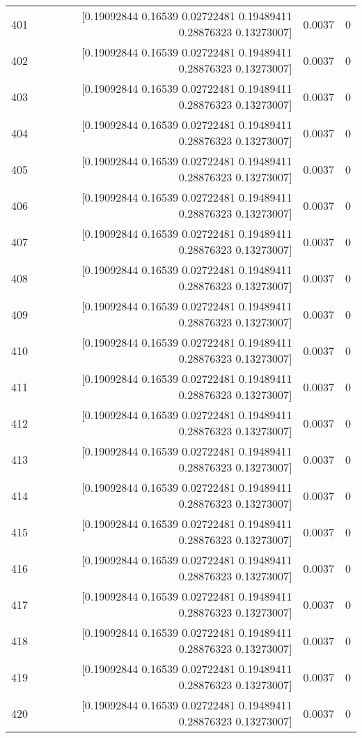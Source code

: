 \begin{longtable}{lrrr}
401 & [0.19092844 0.16539    0.02722481 0.19489411 0.28876323 0.13273007] & 0.0037 & 0 \\
402 & [0.19092844 0.16539    0.02722481 0.19489411 0.28876323 0.13273007] & 0.0037 & 0 \\
403 & [0.19092844 0.16539    0.02722481 0.19489411 0.28876323 0.13273007] & 0.0037 & 0 \\
404 & [0.19092844 0.16539    0.02722481 0.19489411 0.28876323 0.13273007] & 0.0037 & 0 \\
405 & [0.19092844 0.16539    0.02722481 0.19489411 0.28876323 0.13273007] & 0.0037 & 0 \\
406 & [0.19092844 0.16539    0.02722481 0.19489411 0.28876323 0.13273007] & 0.0037 & 0 \\
407 & [0.19092844 0.16539    0.02722481 0.19489411 0.28876323 0.13273007] & 0.0037 & 0 \\
408 & [0.19092844 0.16539    0.02722481 0.19489411 0.28876323 0.13273007] & 0.0037 & 0 \\
409 & [0.19092844 0.16539    0.02722481 0.19489411 0.28876323 0.13273007] & 0.0037 & 0 \\
410 & [0.19092844 0.16539    0.02722481 0.19489411 0.28876323 0.13273007] & 0.0037 & 0 \\
411 & [0.19092844 0.16539    0.02722481 0.19489411 0.28876323 0.13273007] & 0.0037 & 0 \\
412 & [0.19092844 0.16539    0.02722481 0.19489411 0.28876323 0.13273007] & 0.0037 & 0 \\
413 & [0.19092844 0.16539    0.02722481 0.19489411 0.28876323 0.13273007] & 0.0037 & 0 \\
414 & [0.19092844 0.16539    0.02722481 0.19489411 0.28876323 0.13273007] & 0.0037 & 0 \\
415 & [0.19092844 0.16539    0.02722481 0.19489411 0.28876323 0.13273007] & 0.0037 & 0 \\
416 & [0.19092844 0.16539    0.02722481 0.19489411 0.28876323 0.13273007] & 0.0037 & 0 \\
417 & [0.19092844 0.16539    0.02722481 0.19489411 0.28876323 0.13273007] & 0.0037 & 0 \\
418 & [0.19092844 0.16539    0.02722481 0.19489411 0.28876323 0.13273007] & 0.0037 & 0 \\
419 & [0.19092844 0.16539    0.02722481 0.19489411 0.28876323 0.13273007] & 0.0037 & 0 \\
420 & [0.19092844 0.16539    0.02722481 0.19489411 0.28876323 0.13273007] & 0.0037 & 0 \\

\end{longtable}
